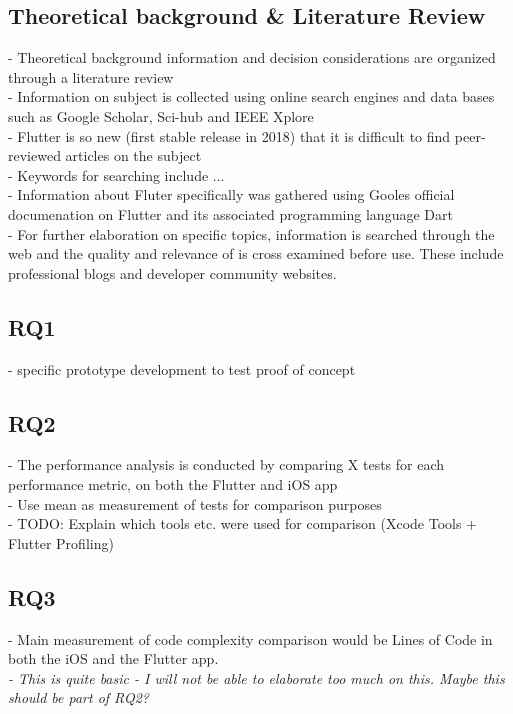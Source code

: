 \subsection{Theoretical background & Literature Review}
- Theoretical background information and decision considerations are organized through a literature review\\
- Information on subject is collected using online search engines and data bases such as Google Scholar, Sci-hub and IEEE Xplore\\
- Flutter is so new (first stable release in 2018) that it is difficult to find peer-reviewed articles on the subject\\
- Keywords for searching include ...\\
- Information about Fluter specifically was gathered using Gooles official documenation on Flutter and its associated programming language Dart\\
- For further elaboration on specific topics, information is searched through the web and the quality and relevance of is cross examined before use. These include professional blogs and developer community websites.\\

\subsection{RQ1}
- specific prototype development to test proof of concept
\subsection{RQ2}
- The performance analysis is conducted by comparing X tests for each performance metric, on both the Flutter and iOS app\\
- Use mean as measurement of tests for comparison purposes\\
- TODO: Explain which tools etc. were used for comparison (Xcode Tools + Flutter Profiling)\\
\subsection{RQ3}
- Main measurement of code complexity comparison would be Lines of Code in both the iOS and the Flutter app.\\
\textit{- This is quite basic - I will not be able to elaborate too much on this. Maybe this should be part of RQ2?}

